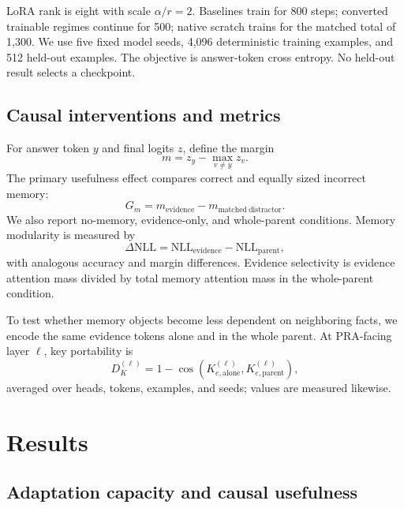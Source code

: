 \documentclass[11pt]{article}
\begin{document}
LoRA rank is eight with scale $\alpha/r=2$. Baselines train for 800 steps;
converted trainable regimes continue for 500; native scratch trains for the
matched total of 1,300. We use five fixed model seeds, 4,096 deterministic
training examples, and 512 held-out examples. The objective is answer-token cross
entropy. No held-out result selects a checkpoint.

\subsection{Causal interventions and metrics}

For answer token $y$ and final logits $z$, define the margin
\begin{equation}
m = z_y - \max_{v\ne y} z_v.
\end{equation}
The primary usefulness effect compares correct and equally sized incorrect
memory:
\begin{equation}
G_m = m_{\mathrm{evidence}} - m_{\mathrm{matched\ distractor}}.
\end{equation}
We also report no-memory, evidence-only, and whole-parent conditions. Memory
modularity is measured by
\begin{equation}
\Delta\mathrm{NLL}=
\mathrm{NLL}_{\mathrm{evidence}}-\mathrm{NLL}_{\mathrm{parent}},
\end{equation}
with analogous accuracy and margin differences. Evidence selectivity is evidence
attention mass divided by total memory attention mass in the whole-parent
condition.

To test whether memory objects become less dependent on neighboring facts, we
encode the same evidence tokens alone and in the whole parent. At PRA-facing layer
$\ell$, key portability is
\begin{equation}
D_K^{(\ell)} = 1-\cos\!\left(K_{e,\mathrm{alone}}^{(\ell)},
K_{e,\mathrm{parent}}^{(\ell)}\right),
\end{equation}
averaged over heads, tokens, examples, and seeds; values are measured likewise.

\section{Results}

\subsection{Adaptation capacity and causal usefulness}
\end{document}
